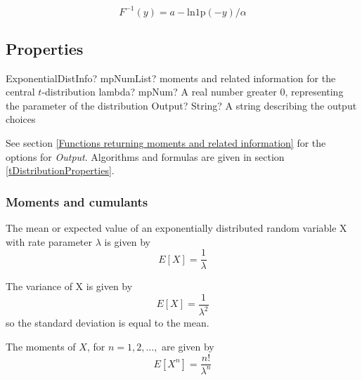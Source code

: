 \vspace{0.3cm}
\begin{equation} 
	F^{-1}(y)=a- \text{ln1p}(-y)/\alpha
\end{equation}



\subsection{Properties}
\label{ExponentialDistributionProperties}


\begin{mpFunctionsExtract}
	\mpFunctionTwoNotImplemented
	{ExponentialDistInfo? mpNumList? moments and related information for the central $t$-distribution}
	{lambda? mpNum? A real number greater 0, representing the parameter of the distribution}
	{Output? String? A string describing the output choices}
\end{mpFunctionsExtract}

\vspace{0.3cm}

See section \ref{Functions returning moments and related information} for the options for {\itshape\sffamily Output}. Algorithms and formulas are given in section \ref{tDistributionProperties}.




\subsubsection{Moments and cumulants}
The mean or expected value of an exponentially distributed random variable X with rate parameter $\lambda$ is given by
\begin{equation} 
	E[X]=\frac{1}{\lambda}
\end{equation}

The variance of X is given by
\begin{equation} 
	E[X]=\frac{1}{\lambda^2}
\end{equation}
so the standard deviation is equal to the mean.

The moments of $X$, for $n = 1, 2, ...,$ are given by
\begin{equation} 
	E[X^n]=\frac{n!}{\lambda^n}
\end{equation}



%
%
%
%

